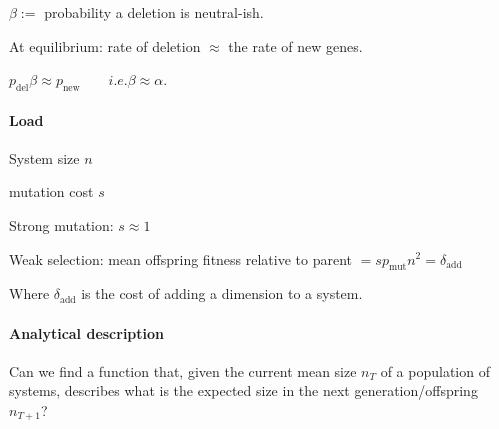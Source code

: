 \documentclass{article}
\begin{document}
$\beta :=$ probability a deletion is neutral-ish. 

At equilibrium: rate of deletion $\approx$ the rate of new genes. 

$p_{\text{del}} \beta \approx p_{\text{new}} \qquad i.e. \beta \approx \alpha$.

\paragraph{Load}

System size $n$

mutation cost $s$

Strong mutation: $s \approx 1$

Weak selection: mean offspring fitness relative to parent $= s p_{\text{mut}} n^2 = \delta_{\text{add}}$

Where $\delta_{\text{add}}$ is the cost of adding a dimension to a system.

\paragraph{Analytical description}
Can we find a function that, given the current mean size $n_T$ of a population of systems, describes what is the expected size in the next generation/offspring $n_{T+1}$?
\end{document}
